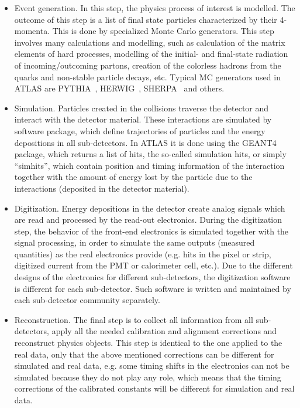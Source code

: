 \begin{itemize}
 \item Event generation. In this step, the physics process of interest is modelled. The outcome of this step is a list of final state particles characterized by their 4-momenta. 
This is done by specialized Monte Carlo generators. 
This step involves many calculations and modelling, such as calculation of the matrix elements of hard processes, modelling of the initial- and final-state radiation of incoming/outcoming partons, creation of the colorless hadrons from the quarks and non-stable particle decays, etc. 
Typical MC generators used in ATLAS
 are PYTHIA~\cite{Pythia}, HERWIG~\cite{Herwig2}, SHERPA~\cite{Sherpa} and others.
 \item Simulation. Particles created in the collisions traverse the detector and interact with the detector material. These interactions are simulated by software package, which define trajectories of particles and the energy depositions in all sub-detectors. 
 In ATLAS it is done using the GEANT4~\cite{Agostinelli:2002hh} package, which returns a list of hits, the so-called simulation hits, or simply ``simhits'', which contain position and timing information of 
 the interaction together with the amount of energy lost by the particle due to the interactions (deposited in the detector material).
 \item Digitization. Energy depositions in the detector create analog signals which are read and processed by the read-out electronics. During the digitization step, the behavior of the front-end electronics is simulated together with the signal processing, in order to simulate the same outputs (measured quantities) as the real electronics provide (e.g. hits in the pixel or strip,
 digitized current from the PMT or calorimeter cell, etc.). Due to the different designs of the electronics for different sub-detectors, the digitization software is different for each sub-detector.
 Such software is written and maintained by each sub-detector community separately.
 \item Reconstruction. The final step is to collect all information from all sub-detectors, apply all the needed calibration and alignment corrections and reconstruct physics objects. This step is identical to the one applied to the real data, only that the above mentioned corrections can be different for simulated and real 
 data, e.g. some timing shifts in the electronics can not be simulated because they do not play any role, which means that the timing corrections of the calibrated constants will be different for simulation and real data.
\end{itemize}

